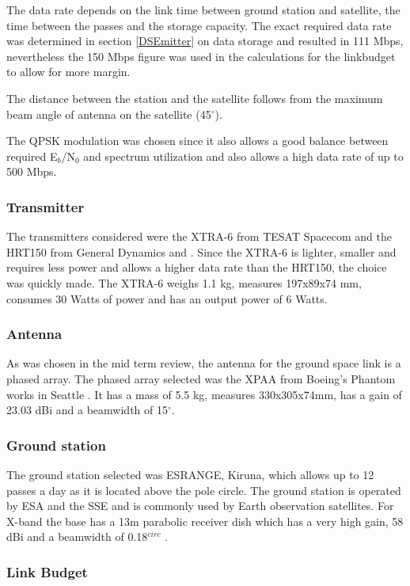 The data rate depends on the link time between ground station and satellite, the time between the passes and the storage capacity. The exact required data rate was determined in section \ref{DSEmitter} on data storage and resulted in 111 Mbps, nevertheless the 150 Mbps figure was used in the calculations for the linkbudget to allow for more margin.

The distance between the station and the satellite follows from the maximum beam angle of antenna on the satellite (45$^{\circ}$).

The QPSK modulation was chosen since it also allows a good balance between required E$_{b}$/N$_{0}$ and spectrum utilization and also allows a high data rate of up to 500 Mbps.

\subsubsection{Transmitter}
The transmitters considered were the XTRA-6 from TESAT Spacecom \cite{TESATxtra} and the HRT150 from General Dynamics and \cite{GD150}. Since the XTRA-6 is lighter, smaller and requires less power and allows a higher data rate than the HRT150, the choice was quickly made.
The XTRA-6 weighs 1.1 kg, measures 197x89x74 mm, consumes 30 Watts of power and has an output power of 6 Watts.

\subsubsection{Antenna}
As was chosen in the mid term review, the antenna for the ground space link is a phased array. The phased array selected was the XPAA from Boeing's Phantom works in Seattle \cite{XPAA}. It has a mass of 5.5 kg, measures 330x305x74mm, has a gain of 23.03 dBi and a beamwidth of 15$^{\circ}$.
\subsubsection{Ground station}
The ground station selected was ESRANGE, Kiruna, which allows up to 12 passes a day as it is located above the pole circle. The ground station is operated by ESA and the SSE and is commonly used by Earth observation satellites. For X-band the base has a 13m parabolic receiver dish which has a very high gain, 58 dBi and a beamwidth of 0.18$^{circ}$ \cite{esrange}.

\subsubsection{Link Budget}

